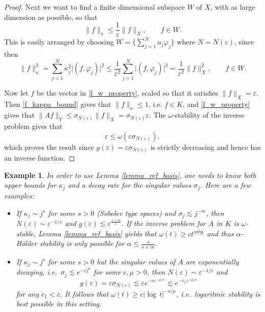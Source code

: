 \documentclass[12pt,twoside]{amsart}
\numberwithin{equation}{section}
\renewcommand{\leq}{\leqslant}
\renewcommand{\geq}{\geqslant}
\newtheorem{example}[theorem]{Example}
\newcommand{\abs}[1]{\lvert #1 \rvert}          %
\newcommand{\norm}[1]{\lVert #1 \rVert}         %
\newcommand{\eps}{\varepsilon}
\begin{document}
\begin{appendix}
\begin{proof}
Next we want to find a finite dimensional subspace $W$ of $X$, with as large dimension as possible, so that 
\begin{equation} \label{f_kappa_bound}
\norm{f}_{\kappa} \leq \frac{1}{\eps} \norm{f}_X, \qquad f \in W.
\end{equation}
This is easily arranged by choosing $W = \{ \sum_{j=1}^N a_j \varphi_j \}$ where $N = N(\eps)$, since then 
\[
\norm{f}_{\kappa}^2 = \sum_{j=1}^N \kappa_j^2 \abs{(f,\varphi_j)}^2 \leq \frac{1}{\eps^2} \sum_{j=1}^N \abs{(f,\varphi_j)}^2 = \frac{1}{\eps^2} \norm{f}_X^2, \qquad f \in W.
\]

Now let $f$ be the vector in \eqref{f_w_property}, scaled so that it satisfies $\norm{f}_{X} = \eps$. Then \eqref{f_kappa_bound} gives that $\norm{f}_{\kappa} \leq 1$, i.e. $f \in K$, and \eqref{f_w_property} gives that $\norm{Af}_Y \leq \sigma_{N(\eps)} \norm{f}_X = \sigma_{N(\eps)} \eps$. The $\omega$-stability of the inverse problem gives that 
\[
\eps \leq \omega(\eps \sigma_{N(\eps)}),
\]
which proves the result since $g(\eps) = \eps \sigma_{N(\eps)}$ is strictly decreasing and hence has an inverse function.
\end{proof}

\begin{example} \label{example_ref_basis}
In order to use Lemma \ref{lemma_ref_basis}, one needs to know both upper bounds for $\kappa_j$ and a decay rate for the singular values $\sigma_j$. Here are a few examples:
\begin{itemize}
\item 
If $\kappa_j \sim j^s$ for some $s > 0$ (Sobolev type spaces) and $\sigma_j \lesssim j^{-m}$, then $N(\eps) \sim \eps^{-1/s}$ and $g(\eps) \lesssim \eps^{\frac{s+m}{s}}$. If the inverse problem for $A$ in $K$ is $\omega$-stable, Lemma \ref{lemma_ref_basis} yields that $\omega(t) \geq c t^{\frac{s}{s+m}}$ and thus $\alpha$-H\"older stability is only possible for $\alpha \leq \frac{s}{s+m}$.
\item 
If $\kappa_j \sim j^s$ for some $s > 0$ but the singular values of $A$ are exponentially decaying, i.e.\ $\sigma_j \lesssim e^{-cj^{\mu}}$ for some $c, \mu > 0$, then $N(\eps) \sim \eps^{-1/s}$ and 
\[
g(\eps) = \eps \sigma_{N(\eps)} \lesssim \eps e^{-c \eps^{-\mu/s}} \lesssim e^{-c_1 \eps^{-\mu/s}}
\]
for any $c_1 < c$. It follows that $\omega(t) \geq c \abs{\log\,t}^{-s/\mu}$, i.e.\ logaritmic stability is best possible in this setting.
\end{itemize}
\end{example}


\end{appendix}
\end{document}
